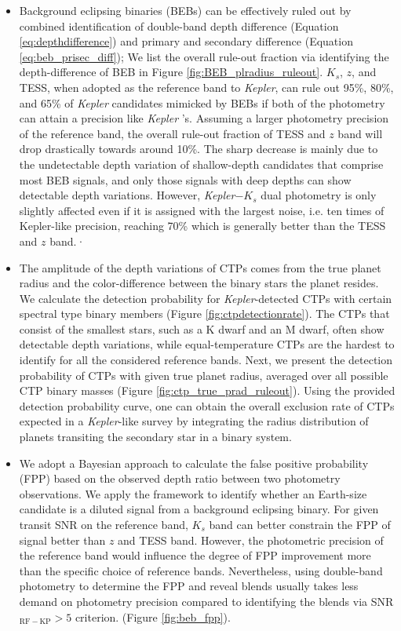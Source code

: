 \documentclass{aastex63}
\begin{document}
\begin{itemize}

    \item Background eclipsing binaries (BEBs) can be effectively ruled out by combined identification of double-band depth difference (Equation \ref{eq:depthdifference}) and primary and secondary difference (Equation \ref{eq:beb_prisec_diff}); We list the overall rule-out fraction via identifying the depth-difference of BEB in Figure \ref{fig:BEB_plradius_ruleout}. $K_s$, $z$, and TESS, when adopted as the reference band to \emph{Kepler}, can rule out 95\%, 80\%, and 65\% of \emph{Kepler} candidates mimicked by BEBs if both of the photometry can attain a precision like \emph{Kepler} 's. Assuming a larger photometry precision of the reference band, the overall rule-out fraction of TESS and $z$ band will drop drastically towards around 10\%. The sharp decrease is mainly due to the undetectable depth variation of shallow-depth candidates that comprise most BEB signals, and only those signals with deep depths can show detectable depth variations. However, \emph{Kepler}$-K_s$ dual photometry is only slightly affected even if it is assigned with the largest noise, i.e. ten times of Kepler-like precision, reaching 70\% which is generally better than the TESS and $z$ band.·
    
    \item The amplitude of the depth variations of CTPs comes from the true planet radius and the color-difference between the binary stars the planet resides. We calculate the detection probability for \emph{Kepler}-detected CTPs with certain spectral type binary members (Figure \ref{fig:ctpdetectionrate}). The CTPs that consist of the smallest stars, such as a K dwarf and an M dwarf, often show detectable depth variations, while equal-temperature CTPs are the hardest to identify for all the considered reference bands. Next, we present the detection probability of CTPs with given true planet radius, averaged over all possible CTP binary masses (Figure \ref{fig:ctp_true_prad_ruleout}). Using the provided detection probability curve, one can obtain the overall exclusion rate of CTPs expected in a \emph{Kepler}-like survey by integrating the radius distribution of planets transiting the secondary star in a binary system.

    \item We adopt a Bayesian approach to calculate the false positive probability (FPP) based on the observed depth ratio between two photometry observations. We apply the framework to identify whether an Earth-size candidate is a diluted signal from a background eclipsing binary. For given transit SNR on the reference band, $K_s$ band can better constrain the FPP of signal better than $z$ and TESS band. However, the photometric precision of the reference band would influence the degree of FPP improvement more than the specific choice of reference bands. Nevertheless, using double-band photometry to determine the FPP and reveal blends usually takes less demand on photometry precision compared to identifying the blends via SNR$_\mathrm{RF-KP}>5$ criterion. (Figure \ref{fig:beb_fpp}). 
    

\end{itemize}
\end{document}
